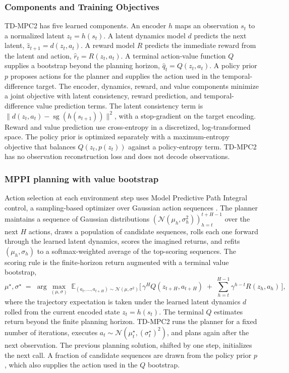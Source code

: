 \subsubsection{Components and Training Objectives}
\label{section:fc_tdmpc2_components}

TD-MPC2 has five learned components. An encoder $h$ maps an observation $s_t$ to a normalized latent $z_t = h(s_t)$. A latent dynamics model $d$ predicts the next latent, $\hat z_{t+1} = d(z_t, a_t)$. A reward model $R$ predicts the immediate reward from the latent and action, $\hat r_t = R(z_t, a_t)$. A terminal action-value function $Q$ supplies a bootstrap beyond the planning horizon, $\hat q_t = Q(z_t, a_t)$. A policy prior $p$ proposes actions for the planner and supplies the action used in the temporal-difference target. The encoder, dynamics, reward, and value components minimize a joint objective with latent consistency, reward prediction, and temporal-difference value prediction terms. The latent consistency term is $\| d(z_t, a_t) - \operatorname{sg}(h(s_{t+1})) \|^2$, with a stop-gradient on the target encoding. Reward and value prediction use cross-entropy in a discretized, log-transformed space. The policy prior is optimized separately with a maximum-entropy objective that balances $Q(z_t,p(z_t))$ against a policy-entropy term. TD-MPC2 has no observation reconstruction loss and does not decode observations.

\subsubsection{MPPI planning with value bootstrap}
\label{section:fc_tdmpc2_mppi}

Action selection at each environment step uses Model Predictive Path Integral control, a sampling-based optimizer over Gaussian action sequences \citep{Hansen2024TDMPC2}. The planner maintains a sequence of Gaussian distributions $(\mathcal{N}(\mu_h, \sigma_h^2))_{h=t}^{t+H-1}$ over the next $H$ actions, draws a population of candidate sequences, rolls each one forward through the learned latent dynamics, scores the imagined returns, and refits $(\mu_h, \sigma_h)$ to a softmax-weighted average of the top-scoring sequences. The scoring rule is the finite-horizon return augmented with a terminal value bootstrap,
\[
  \mu^\star, \sigma^\star \;=\; \arg\max_{(\mu,\sigma)} \;\mathbb{E}_{(a_t, \ldots, a_{t+H}) \sim \mathcal{N}(\mu, \sigma^2)} \Big[\, \gamma^{H} Q(z_{t+H}, a_{t+H}) \;+\; \sum_{h=t}^{H-1} \gamma^{h-t} R(z_h, a_h) \,\Big],
\]
where the trajectory expectation is taken under the learned latent dynamics $d$ rolled from the current encoded state $z_t = h(s_t)$. The terminal $Q$ estimates return beyond the finite planning horizon. TD-MPC2 runs the planner for a fixed number of iterations, executes $a_t \sim \mathcal{N}(\mu_t^\star, (\sigma_t^\star)^2)$, and plans again after the next observation. The previous planning solution, shifted by one step, initializes the next call. A fraction of candidate sequences are drawn from the policy prior $p$, which also supplies the action used in the $Q$ bootstrap.

